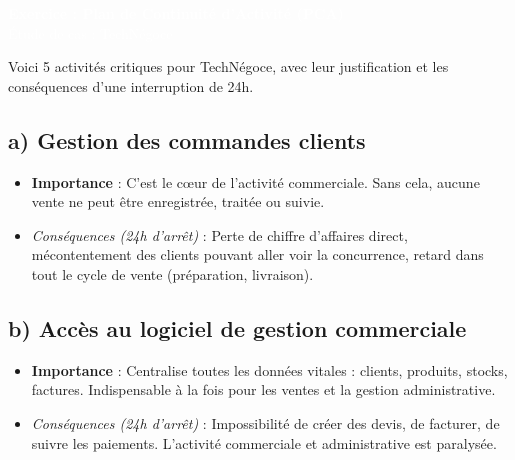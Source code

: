 \documentclass[a4paper,10pt]{article}
\newcommand{\notion}[1]{\textbf{\textcolor{mainBlue}{#1}}}
\newcommand{\important}[1]{\textit{\textcolor{alertRed}{#1}}}
\begin{document}
\begin{center}
    \colorbox{mainBlue}{\parbox{\dimexpr\textwidth-2\fboxsep}{
        \centering
        \vspace{0.2cm}
        {\Huge \textbf{\textcolor{white}{Exercice : Plan de Continuité d'Activité (PCA)}}} \\
        \vspace{0.1cm}
        {\Large \textcolor{white}{Étude de cas : TechNégoce}}
        \vspace{0.2cm}
    }}
\end{center}
\vspace{0.5cm}

\begin{tcolorbox}[title=1) Identifier les activités critiques]
    Voici 5 activités critiques pour TechNégoce, avec leur justification et les conséquences d'une interruption de 24h.

    \subsection*{a) Gestion des commandes clients}
    \begin{itemize}[leftmargin=*]
        \item \notion{Importance} : C'est le cœur de l'activité commerciale. Sans cela, aucune vente ne peut être enregistrée, traitée ou suivie.
        \item \important{Conséquences (24h d'arrêt)} : Perte de chiffre d'affaires direct, mécontentement des clients pouvant aller voir la concurrence, retard dans tout le cycle de vente (préparation, livraison).
    \end{itemize}

    \subsection*{b) Accès au logiciel de gestion commerciale}
    \begin{itemize}[leftmargin=*]
        \item \notion{Importance} : Centralise toutes les données vitales : clients, produits, stocks, factures. Indispensable à la fois pour les ventes et la gestion administrative.
        \item \important{Conséquences (24h d'arrêt)} : Impossibilité de créer des devis, de facturer, de suivre les paiements. L'activité commerciale et administrative est paralysée.
    \end{itemize}


\end{tcolorbox}
\end{document}
